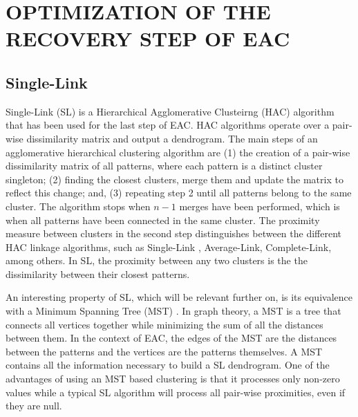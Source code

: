 \section{\uppercase{Optimization of the recovery step of EAC}}
\label{sec:recovery}

\subsection{Single-Link}

Single-Link (SL) is a Hierarchical Agglomerative Clusteirng (HAC) algorithm that has been used for the last step of EAC.
HAC algorithms operate over a pair-wise dissimilarity matrix and output a dendrogram.
The main steps of an agglomerative hierarchical clustering algorithm are \cite{Jain1999} (1) the creation of a pair-wise dissimilarity matrix of all patterns, where each pattern is a distinct cluster singleton; (2) finding the closest clusters, merge them and update the matrix to reflect this change; and, (3) repeating step 2 until all patterns belong to the same cluster.
The algorithm stops when $n-1$ merges have been performed, which is when all patterns have been connected in the same cluster.
The proximity measure between clusters in the second step distinguishes between the different HAC linkage algorithms, such as Single-Link , Average-Link, Complete-Link, among others.
In SL, the proximity between any two clusters is the the dissimilarity between their closest patterns.

An interesting property of SL, which will be relevant further on, is its equivalence with a Minimum Spanning Tree (MST) \cite{Gower1969}.
In graph theory, a MST is a tree that connects all vertices together while minimizing the sum of all the distances between them.
In the context of EAC, the edges of the MST are the distances between the patterns and the vertices are the patterns themselves.
A MST contains all the information necessary to build a SL dendrogram.
One of the advantages of using an MST based clustering is that it processes only non-zero values while a typical SL algorithm will process all pair-wise proximities, even if they are null.



